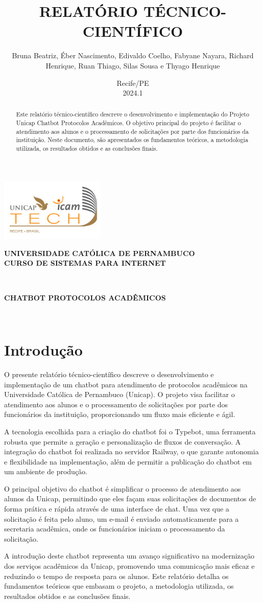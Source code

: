 \documentclass[12pt,a4paper]{article} %
\title{\textbf{\MakeUppercase{Relatório Técnico-Científico}}}
\author{Bruna Beatriz, Éber Nascimento, Edivaldo Coelho, Fabyane Nayara, Richard Henrique, Ruan Thiago, Silas Sousa e Thyago Henrique}
\date{Recife/PE \\ 2024.1}
\renewcommand{\maketitle}{\begin{titlepage}
\begin{center}
\includegraphics[width=5cm]{img/Unicap_Icam_Tech-01.png} \\ %
\vspace*{1cm}

\textbf{\Large\scshape UNIVERSIDADE CATÓLICA DE PERNAMBUCO} \\
\vspace*{0.5cm}
\textbf{\Large\scshape CURSO DE SISTEMAS PARA INTERNET} \\
\vspace*{2cm}

\textbf{\fontsize{18pt}{\baselineskip}\selectfont \MakeUppercase{\thetitle}} \\

\vspace*{0.5cm}

\textbf{\fontsize{14pt}{\baselineskip}\selectfont \MakeUppercase{Chatbot Protocolos Acadêmicos}} \\

\vspace*{2cm}

\textbf{\fontsize{14pt}{\baselineskip}\selectfont \MakeUppercase{\theauthor}} \\

\vfill

\textbf{\Large\MakeUppercase{\thedate}}

\end{center}
\end{titlepage}}
\begin{document}
\maketitle

\newpage

\begin{abstract}
\noindent Este relatório técnico-científico descreve o desenvolvimento e implementação do Projeto Unicap Chatbot Protocolos Acadêmicos. O objetivo principal do projeto é facilitar o atendimento aos alunos e o processamento de solicitações por parte dos funcionários da instituição. Neste documento, são apresentados os fundamentos teóricos, a metodologia utilizada, os resultados obtidos e as conclusões finais.
\end{abstract}

\newpage

\tableofcontents

\newpage

\section{Introdução}

\noindent O presente relatório técnico-científico descreve o desenvolvimento e implementação de um chatbot para atendimento de protocolos acadêmicos na Universidade Católica de Pernambuco (Unicap). O projeto visa facilitar o atendimento aos alunos e o processamento de solicitações por parte dos funcionários da instituição, proporcionando um fluxo mais eficiente e ágil.

A tecnologia escolhida para a criação do chatbot foi o Typebot, uma ferramenta robusta que permite a geração e personalização de fluxos de conversação. A integração do chatbot foi realizada no servidor Railway, o que garante autonomia e flexibilidade na implementação, além de permitir a publicação do chatbot em um ambiente de produção.

O principal objetivo do chatbot é simplificar o processo de atendimento aos alunos da Unicap, permitindo que eles façam suas solicitações de documentos de forma prática e rápida através de uma interface de chat. Uma vez que a solicitação é feita pelo aluno, um e-mail é enviado automaticamente para a secretaria acadêmica, onde os funcionários iniciam o processamento da solicitação.

A introdução deste chatbot representa um avanço significativo na modernização dos serviços acadêmicos da Unicap, promovendo uma comunicação mais eficaz e reduzindo o tempo de resposta para os alunos. Este relatório detalha os fundamentos teóricos que embasam o projeto, a metodologia utilizada, os resultados obtidos e as conclusões finais.
\end{document}
